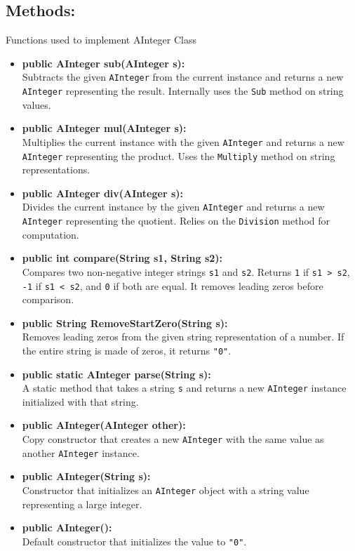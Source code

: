 \documentclass{article}
\begin{document}
\subsection*{Methods:}
Functions used to implement AInteger Class
\begin{itemize}

\item \textbf{public AInteger sub(AInteger s):} \\
Subtracts the given \texttt{AInteger} from the current instance and returns a new \texttt{AInteger} representing the result. Internally uses the \texttt{Sub} method on string values.

\item \textbf{public AInteger mul(AInteger s):} \\
Multiplies the current instance with the given \texttt{AInteger} and returns a new \texttt{AInteger} representing the product. Uses the \texttt{Multiply} method on string representations.

\item \textbf{public AInteger div(AInteger s):} \\
Divides the current instance by the given \texttt{AInteger} and returns a new \texttt{AInteger} representing the quotient. Relies on the \texttt{Division} method for computation.

\item \textbf{public int compare(String s1, String s2):} \\
Compares two non-negative integer strings \texttt{s1} and \texttt{s2}. Returns \texttt{1} if \texttt{s1 > s2}, \texttt{-1} if \texttt{s1 < s2}, and \texttt{0} if both are equal. It removes leading zeros before comparison.

\item \textbf{public String RemoveStartZero(String s):} \\
Removes leading zeros from the given string representation of a number. If the entire string is made of zeros, it returns \texttt{"0"}.

\item \textbf{public static AInteger parse(String s):} \\
A static method that takes a string \texttt{s} and returns a new \texttt{AInteger} instance initialized with that string.

\item \textbf{public AInteger(AInteger other):} \\
Copy constructor that creates a new \texttt{AInteger} with the same value as another \texttt{AInteger} instance.

\item \textbf{public AInteger(String s):} \\
Constructor that initializes an \texttt{AInteger} object with a string value representing a large integer.

\item \textbf{public AInteger():} \\
Default constructor that initializes the value to \texttt{"0"}.

\end{itemize}
\end{document}
